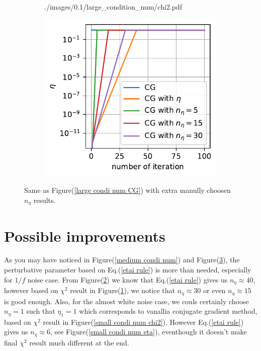 \documentclass[11pt, letterpaper]{article}
\begin{document}
\begin{figure}[htb]
\begin{subfigure}{0.33\textwidth}
        {./images/0.1/large_condition_num/chi2.pdf}
    \caption{}
    \label{large condi num chi2}
\end{subfigure}%
\begin{subfigure}{0.33\textwidth}
    \centering
    \includegraphics[width=\linewidth]
        {./images/0.1/large_condition_num/eta.pdf}
    \caption{}
    \label{large condi num eta}
\end{subfigure}
\caption{Same as Figure(\ref{large condi num CG}) with extra manully choosen 
    $n_{\eta}$ results.
}
\label{large condi num}
\end{figure}

\section{Possible improvements}
As you may have noticed in Figure(\ref{medium condi num})
and Figure(\ref{large condi num}), the perturbative parameter based on
Eq.(\ref{etai rule}) is more than needed, especially for $1/f$ noise case.
From Figure(\ref{large condi num eta}) we know that Eq.(\ref{etai rule}) gives
us $n_{\eta}\approx40$, however based on $\chi^2$ result in 
Figure(\ref{large condi num chi2}), we notice that $n_{\eta}\approx30$ or 
even $n_{\eta} \approx 15$ is good enough.
Also, for the almost white noise case, we couls certainly choose $n_{\eta}=1$
such that $\eta_1=1$ which corresponds to vanallia conjugate gradient method,
based on $\chi^2$ result in Figure(\ref{small condi num chi2}).
However Eq.(\ref{etai rule}) gives us $n_{\eta} \approx 6$,
see Figure(\ref{small condi num eta}), eventhough it doesn't make final 
$\chi^2$ result much different at the end.
\end{document}

